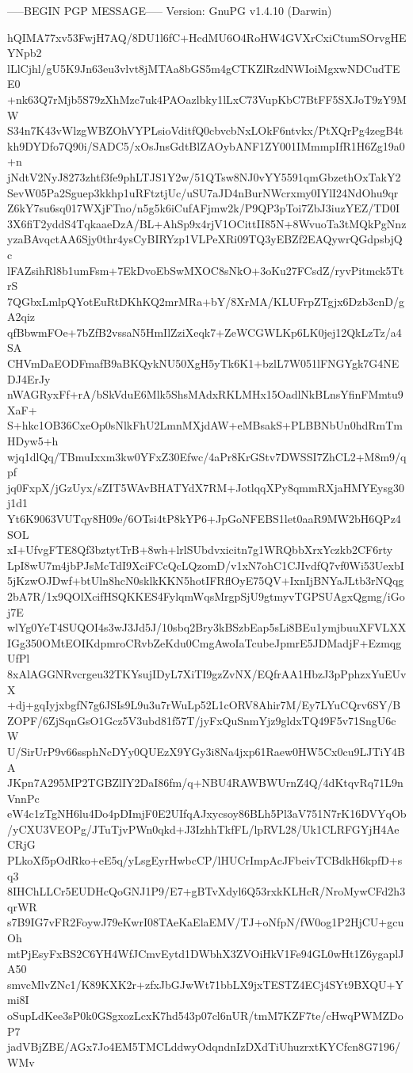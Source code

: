 -----BEGIN PGP MESSAGE-----
Version: GnuPG v1.4.10 (Darwin)

hQIMA77xv53FwjH7AQ/8DU1l6fC+HcdMU6O4RoHW4GVXrCxiCtumSOrvgHEYNpb2
lLlCjhl/gU5K9Jn63eu3vlvt8jMTAa8bGS5m4gCTKZlRzdNWIoiMgxwNDCudTEE0
+nk63Q7rMjb5S79zXhMzc7uk4PAOazlbky1lLxC73VupKbC7BtFF5SXJoT9zY9MW
S34n7K43vWlzgWBZOhVYPLsioVditfQ0cbvcbNxLOkF6ntvkx/PtXQrPg4zegB4t
kh9DYDfo7Q90i/SADC5/xOsJnsGdtBlZAOybANF1ZY001IMmmpIfR1H6Zg19a0+n
jNdtV2NyJ8273zhtf3fe9phLTJS1Y2w/51QTsw8NJ0vYY5591qmGbzethOxTakY2
SevW05Pa2Sguep3kkhp1uRFtztjUc/uSU7aJD4nBurNWcrxmy0IYlI24NdOhu9qr
Z6kY7su6sq017WXjFTno/n5g5k6iCufAFjmw2k/P9QP3pToi7ZbJ3iuzYEZ/TD0I
3X6fiT2yddS4TqkaaeDzA/BL+AhSp9x4rjV1OCittII85N+8WvuoTa3tMQkPgNnz
yzaBAvqctAA6Sjy0thr4ysCyBIRYzp1VLPeXRi09TQ3yEBZf2EAQywrQGdpsbjQc
lFAZsihRl8b1umFsm+7EkDvoEbSwMXOC8sNkO+3oKu27FCsdZ/ryvPitmck5TtrS
7QGbxLmlpQYotEuRtDKhKQ2mrMRa+bY/8XrMA/KLUFrpZTgjx6Dzb3cnD/gA2qiz
qfBbwmFOe+7bZfB2vssaN5HmIlZziXeqk7+ZeWCGWLKp6LK0jej12QkLzTz/a4SA
CHVmDaEODFmafB9aBKQykNU50XgH5yTk6K1+bzlL7W051lFNGYgk7G4NEDJ4ErJy
nWAGRyxFf+rA/bSkVduE6Mlk5ShsMAdxRKLMHx15OadlNkBLnsYfinFMmtu9XaF+
S+hkc1OB36CxeOp0sNlkFhU2LmnMXjdAW+eMBsakS+PLBBNbUn0hdRmTmHDyw5+h
wjq1dlQq/TBmuIxxm3kw0YFxZ30Efwc/4aPr8KrGStv7DWSSI7ZhCL2+M8m9/qpf
jq0FxpX/jGzUyx/sZIT5WAvBHATYdX7RM+JotlqqXPy8qmmRXjaHMYEysg30j1d1
Yt6K9063VUTqy8H09e/6OTsi4tP8kYP6+JpGoNFEBS1let0aaR9MW2bH6QPz4SOL
xI+UfvgFTE8Qf3bztytTrB+8wh+lrlSUbdvxicitn7g1WRQbbXrxYczkb2CF6rty
LpI8wU7m4jbPJsMcTdI9XciFCcQcLQzomD/v1xN7ohC1CJIvdfQ7vf0Wi53UexbI
5jKzwOJDwf+btUln8hcN0sklkKKN5hotIFRflOyE75QV+IxnIjBNYaJLtb3rNQqg
2bA7R/1x9QOlXcifHSQKKES4FylqmWqsMrgpSjU9gtmyvTGPSUAgxQgmg/iGoj7E
wlYg0YeT4SUQOI4s3wJ3Jd5J/10sbq2Bry3kBSzbEap5sLi8BEu1ymjbuuXFVLXX
IGg350OMtEOIKdpmroCRvbZeKdu0CmgAwoIaTcubeJpmrE5JDMadjF+EzmqgUfPl
8xAlAGGNRvcrgeu32TKYsujIDyL7XiTI9gzZvNX/EQfrAA1HbzJ3pPphzxYuEUvX
+dj+gqIyjxbgfN7g6JSIs9L9u3u7rWuLp52L1cORV8Ahir7M/Ey7LYuCQrv6SY/B
ZOPF/6ZjSqnGsO1Gcz5V3ubd81f57T/jyFxQuSnmYjz9gldxTQ49F5v71SngU6cW
U/SirUrP9v66ssphNcDYy0QUEzX9YGy3i8Na4jxp61Raew0HW5Cx0cu9LJTiY4BA
JKpn7A295MP2TGBZlIY2DaI86fm/q+NBU4RAWBWUrnZ4Q/4dKtqvRq71L9nVnnPc
eW4c1zTgNH6lu4Do4pDImjF0E2UIfqAJxycsoy86BLh5Pl3aV751N7rK16DVYqOb
/yCXU3VEOPg/JTuTjvPWn0qkd+J3IzhhTkfFL/lpRVL28/Uk1CLRFGYjH4AeCRjG
PLkoXf5pOdRko+eE5q/yLsgEyrHwbcCP/lHUCrImpAcJFbeivTCBdkH6kpfD+sq3
8IHChLLCr5EUDHcQoGNJ1P9/E7+gBTvXdyl6Q53rxkKLHcR/NroMywCFd2h3qrWR
s7B9IG7vFR2FoywJ79eKwrI08TAeKaElaEMV/TJ+oNfpN/fW0og1P2HjCU+gcuOh
mtPjEsyFxBS2C6YH4WfJCmvEytd1DWbhX3ZVOiHkV1Fe94GL0wHt1Z6ygaplJA50
smvcMlvZNc1/K89KXK2r+zfxJbGJwWt71bbLX9jxTESTZ4ECj4SYt9BXQU+Ymi8I
oSupLdKee3sP0k0GSgxozLcxK7hd543p07cl6nUR/tmM7KZF7te/cHwqPWMZDoP7
jadVBjZBE/AGx7Jo4EM5TMCLddwyOdqndnIzDXdTiUhuzrxtKYCfcn8G7196/WMv

